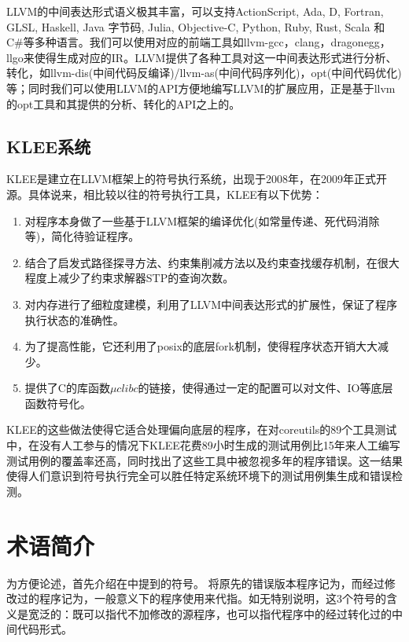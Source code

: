 LLVM的中间表达形式语义极其丰富，可以支持ActionScript, Ada, D, Fortran, GLSL, Haskell, Java 字节码, Julia, Objective-C, Python, Ruby, Rust, Scala 和 C\#等多种语言。我们可以使用对应的前端工具如llvm-gcc，clang，dragonegg，llgo来使得生成对应的IR。LLVM提供了各种工具对这一中间表达形式进行分析、转化，如llvm-dis(中间代码反编译)/llvm-as(中间代码序列化)，opt(中间代码优化)等；同时我们可以使用LLVM的API方便地编写LLVM的扩展应用，\dryrun 正是基于llvm的opt工具和其提供的分析、转化的API之上的。

\subsection{KLEE系统}
\label{sec:klee}

KLEE是建立在LLVM框架上的符号执行系统，出现于2008年，在2009年正式开源。具体说来，相比较以往的符号执行工具，KLEE有以下优势：
\begin{enumerate}
\item 对程序本身做了一些基于LLVM框架的编译优化(如常量传递、死代码消除等)，简化待验证程序。
\item 结合了启发式路径探寻方法、约束集削减方法以及约束查找缓存机制，在很大程度上减少了约束求解器STP的查询次数。
\item 对内存进行了细粒度建模，利用了LLVM中间表达形式的扩展性，保证了程序执行状态的准确性。
\item 为了提高性能，它还利用了posix的底层fork机制，使得程序状态开销大大减少。
\item 提供了C的库函数$\mu clibc$的链接，使得通过一定的配置可以对文件、IO等底层函数符号化。
\end{enumerate}

KLEE的这些做法使得它适合处理偏向底层的程序，在对coreutils的89个工具测试中，在没有人工参与的情况下KLEE花费89小时生成的测试用例比15年来人工编写测试用例的覆盖率还高，同时找出了这些工具中被忽视多年的程序错误。这一结果使得人们意识到符号执行完全可以胜任特定系统环境下的测试用例集生成和错误检测。

\section{术语简介}
\label{sec:term}
为方便论述，首先介绍在中提到的符号。
将原先的错误版本程序记为\bug ，而经过修改过的程序记为\patch ，一般意义下的程序使用\prog 来代指。如无特别说明，这3个符号的含义是宽泛的：既可以指代不加修改的源程序，也可以指代程序中的经过转化过的中间代码形式。

